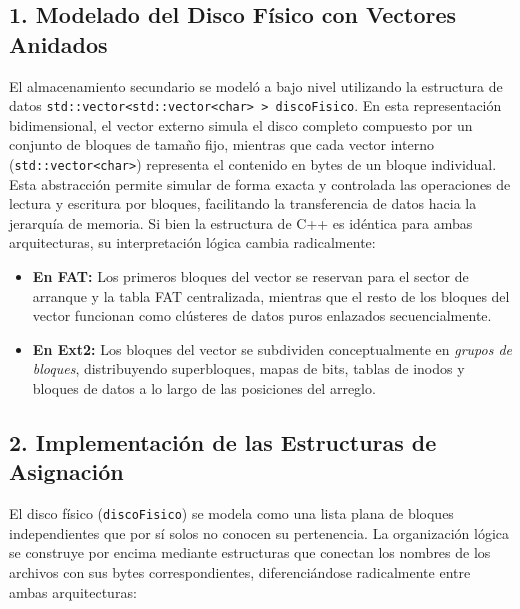 \documentclass[12pt,a4paper]{article}
\begin{document}
	\subsection{1. Modelado del Disco Físico con Vectores Anidados}
	El almacenamiento secundario se modeló a bajo nivel utilizando la estructura de datos \texttt{std::vector<std::vector<char> > discoFisico}. En esta representación bidimensional, el vector externo simula el disco completo compuesto por un conjunto de bloques de tamaño fijo, mientras que cada vector interno (\texttt{std::vector<char>}) representa el contenido en bytes de un bloque individual. Esta abstracción permite simular de forma exacta y controlada las operaciones de lectura y escritura por bloques, facilitando la transferencia de datos hacia la jerarquía de memoria. Si bien la estructura de C++ es idéntica para ambas arquitecturas, su interpretación lógica cambia radicalmente:
	\begin{itemize}
		\item \textbf{En FAT:} Los primeros bloques del vector se reservan para el sector de arranque y la tabla FAT centralizada, mientras que el resto de los bloques del vector funcionan como clústeres de datos puros enlazados secuencialmente.
		\item \textbf{En Ext2:} Los bloques del vector se subdividen conceptualmente en \textit{grupos de bloques}, distribuyendo superbloques, mapas de bits, tablas de inodos y bloques de datos a lo largo de las posiciones del arreglo.
	\end{itemize}
	
	\subsection{2. Implementación de las Estructuras de Asignación}
	
	El disco físico (\texttt{discoFisico}) se modela como una lista plana de bloques independientes que por sí solos no conocen su pertenencia. La organización lógica se construye por encima mediante estructuras que conectan los nombres de los archivos con sus bytes correspondientes, diferenciándose radicalmente entre ambas arquitecturas:
	
\end{document}
